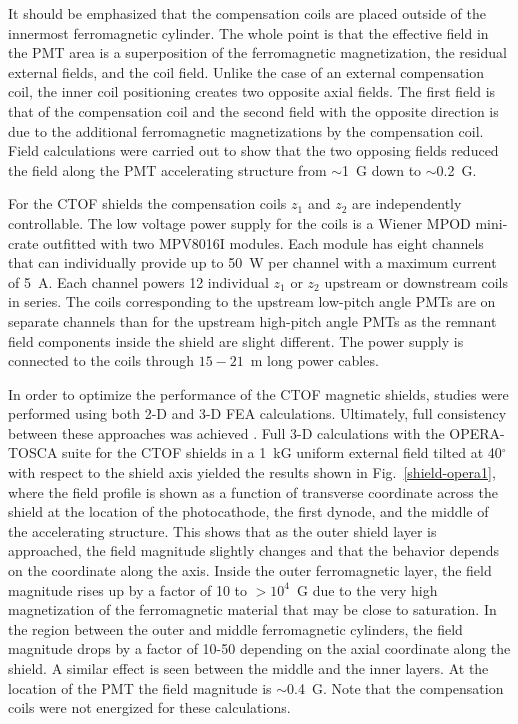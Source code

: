 \documentclass[3p,times,twocolumn]{elsarticle}
\begin{document}
It should be emphasized that the compensation coils are placed outside of the innermost ferromagnetic
cylinder. The whole point is that the effective field in the PMT area is a superposition of the ferromagnetic
magnetization, the residual external fields, and the coil field. Unlike the case of an external compensation
coil, the inner coil positioning creates two opposite axial fields. The first field is that of the compensation
coil and the second field with the opposite direction is due to the additional ferromagnetic magnetizations
by the compensation coil. Field calculations were carried out to show that the two opposing fields reduced
the field along the PMT accelerating structure from $\sim$1~G down to $\sim$0.2~G.

For the CTOF shields the compensation coils $z_1$ and $z_2$ are independently controllable. The low
voltage power supply for the coils is a Wiener MPOD mini-crate outfitted with two MPV8016I modules. Each
module has eight channels that can individually provide up to 50~W per channel with a maximum current of
5~A. Each channel powers 12 individual $z_1$ or $z_2$ upstream or downstream coils in series. The coils
corresponding to the upstream low-pitch angle PMTs are on separate channels than for the upstream
high-pitch angle PMTs as the remnant field components inside the shield are slight different. The power
supply is connected to the coils through $15 - 21$~m long power cables. 

In order to optimize the performance of the CTOF magnetic shields, studies were performed using both
2-D and 3-D FEA calculations. Ultimately, full consistency between these approaches was achieved
\cite{cn2015-003}. Full 3-D calculations with the OPERA-TOSCA suite for the CTOF shields in a 1~kG
uniform external field tilted at 40$^\circ$ with respect to the shield axis yielded the results shown in
Fig.~\ref{shield-opera1}, where the field profile is shown as a function of transverse coordinate across the
shield at the location of the photocathode, the first dynode, and the middle of the accelerating structure.
This shows that as the outer shield layer is approached, the field magnitude slightly changes and that the
behavior depends on the coordinate along the axis. Inside the outer ferromagnetic layer, the field magnitude
rises up by a factor of 10 to $>\!10^4$~G due to the very high magnetization of the ferromagnetic material
that may be close to saturation. In the region between the outer and middle ferromagnetic cylinders, the
field magnitude drops by a factor of 10-50 depending on the axial coordinate along the shield. A similar
effect is seen between the middle and the inner layers. At the location of the PMT the field magnitude is
$\sim$0.4~G. Note that the compensation coils were not energized for these calculations. 
\end{document}
